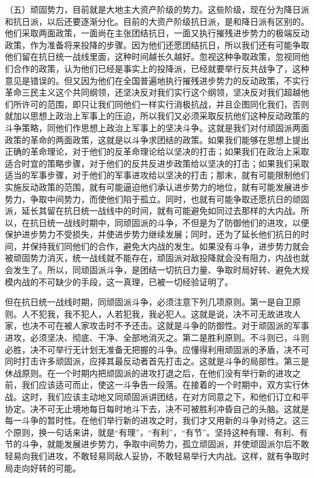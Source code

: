 （五）顽固势力，目前就是大地主大资产阶级的势力。这些阶级，现在分为降日派和抗日派，以后还要逐渐分化。目前的大资产阶级抗日派，是和降日派有区别的。他们采取两面政策，一面尚在主张团结抗日，一面又执行摧残进步势力的极端反动政策，作为准备将来投降的步骤。因为他们还愿团结抗日，所以我们还有可能争取他们留在抗日统一战线里面，这种时间越长久越好。忽视这种争取政策，忽视同他们合作的政策，认为他们已经是事实上的投降派，已经就要举行反共战争了，这种意见是错误的。但又因为他们在全国普遍地执行摧残进步势力的反动政策，不实行革命三民主义这个共同纲领，还坚决反对我们实行这个纲领，坚决反对我们超越他们所许可的范围，即只让我们同他们一样实行消极抗战，并且企图同化我们，否则就加以思想上政治上军事上的压迫，所以我们又必须采取反抗他们这种反动政策的斗争策略，同他们作思想上政治上军事上的坚决斗争。这就是我们对付顽固派两面政策的革命的两面政策，这就是以斗争求团结的政策。如果我们能够在思想上提出正确的革命理论，对于他们的反革命理论给以坚决的打击；如果我们在政治上采取适合时宜的策略步骤，对于他们的反共反进步政策给以坚决的打击；如果我们采取适当的军事步骤，对于他们的军事进攻给以坚决的打击；那末，就有可能限制他们实施反动政策的范围，就有可能逼迫他们承认进步势力的地位，就有可能发展进步势力，争取中间势力，而使他们陷于孤立。同时，也就有可能争取还愿抗日的顽固派，延长其留在抗日统一战线中的时间，就有可能避免如同过去那样的大内战。所以，在抗日统一战线时期中，同顽固派的斗争，不但是为了防御他们的进攻，以便保护进步势力不受损失，并使进步势力继续发展；同时，还为了延长他们抗日的时间，并保持我们同他们的合作，避免大内战的发生。如果没有斗争，进步势力就会被顽固势力消灭，统一战线就不能存在，顽固派对敌投降就会没有阻力，内战也就会发生了。所以，同顽固派斗争，是团结一切抗日力量、争取时局好转、避免大规模内战的不可缺少的手段，这一真理，已被一切经验证明了。

但在抗日统一战线时期，同顽固派斗争，必须注意下列几项原则。第一是自卫原则。人不犯我，我不犯人，人若犯我，我必犯人。这就是说，决不可无故进攻人家，也决不可在被人家攻击时不予还击。这就是斗争的防御性。对于顽固派的军事进攻，必须坚决、彻底、干净、全部地消灭之。第二是胜利原则。不斗则已，斗则必胜，决不可举行无计划无准备无把握的斗争。应懂得利用顽固派的矛盾，决不可同时打击许多顽固派，应择其最反动者首先打击之。这就是斗争的局部性。第三是休战原则。在一个时期内把顽固派的进攻打退之后，在他们没有举行新的进攻之前，我们应该适可而止，使这一斗争告一段落。在接着的一个时期中，双方实行休战。这时，我们应该主动地又同顽固派讲团结，在对方同意之下，和他们订立和平协定。决不可无止境地每日每时地斗下去，决不可被胜利冲昏自己的头脑。这就是每一斗争的暂时性。在他们举行新的进攻之时，我们才又用新的斗争对待之。这三个原则，换一句话来讲，就是“有理”，“有利”，“有节”。坚持这种有理、有利、有节的斗争，就能发展进步势力，争取中间势力，孤立顽固派，并使顽固派尔后不敢轻易向我们进攻，不敢轻易同敌人妥协，不敢轻易举行大内战。这样，就有争取时局走向好转的可能。

